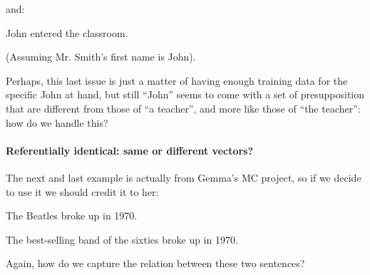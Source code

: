 \documentclass[a4paper,12pt]{article}
\begin{document}
and:

John entered the classroom.

(Assuming Mr. Smith's first name is John).

Perhaps, this last issue is just a matter of having enough
training data
for the specific John at hand, but still ``John'' seems to
come with a set of
presupposition that are different from those of ``a
teacher'', and more like
those of ``the teacher'': how do we handle this?

\paragraph{Referentially identical: same or different
  vectors?}
The next and last example is actually from Gemma's MC
project, so if we
decide to use it we should credit it to her:

The Beatles broke up in 1970.

The best-selling band of the sixties broke up in 1970.

Again, how do we capture the relation between these two
sentences?




\end{document}
